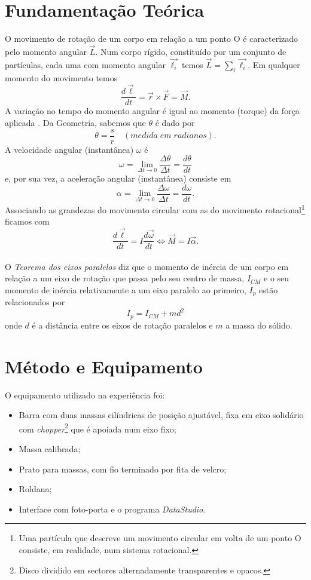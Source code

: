 \documentclass[11pt]{report}
\begin{document}
\chapter{Fundamentação Teórica}
O movimento de rotação de um corpo em relação a um ponto O é caracterizado pelo momento angular $\overrightarrow{L}$. Num corpo rígido, constituído por um conjunto de partículas, cada uma com momento angular $\overrightarrow{\ell_i}$ temos $\overrightarrow{L}=\sum_i \overrightarrow{\ell_i}$.
Em qualquer momento do movimento temos $$\frac{d\overrightarrow{\ell}}{dt}= \overrightarrow{r} \times \overrightarrow{F} = \overrightarrow{M}. $$
A variação no tempo do momento angular é igual ao momento (torque) da força aplicada \cite{Cruz}.
Da Geometria, sabemos que $\theta$ é dado por $$\theta = \frac{s}{r} \quad(medida\; em\; radianos). $$
A velocidade angular (instantânea) $\omega$ é $$\omega = \lim_{\Delta t \to 0} \frac{\Delta \theta}{\Delta t}= \frac{d \theta}{dt} $$
e, por sua vez, a aceleração angular (instantânea) consiste em 
$$\alpha = \lim_{\Delta t \to 0} \frac{\Delta \omega}{\Delta t}= \frac{d \omega}{dt}. $$
Associando as grandezas do movimento circular com as do movimento rotacional\footnote{Uma partícula que descreve um movimento circular em volta de um ponto O consiste, em realidade, num sistema rotacional.} ficamos com $$\frac{d\overrightarrow{\ell}}{dt}=I\frac{d\overrightarrow{\omega}}{dt} \iff \overrightarrow{M}=I\overrightarrow{\alpha}.$$\\
O \textit{Teorema dos eixos paralelos} diz que o momento de inércia de um corpo em relação a um eixo de rotação  que passa pelo seu centro de massa, $I_{CM}$ e o seu momento de inércia relativamente a um eixo paralelo ao primeiro, $I_p$ estão relacionados por $$I_p=I_{CM}+md^2$$ onde $d$ é a distância entre os eixos de rotação paralelos e $m$ a massa do sólido\cite{Cruz}.
\chapter{Método e Equipamento}
O equipamento utilizado na experiência foi:
\begin{itemize}
\item Barra com duas massas cilíndricas de posição ajustável, fixa em eixo solidário com \textit{chopper}\footnote{Disco dividido em sectores alternadamente transparentes e opacos.} que é apoiada num eixo fixo;
\item Massa calibrada;
\item Prato para massas, com fio terminado por fita de velcro; 
\item Roldana;
\item Interface com foto-porta e o programa \textit{DataStudio}.
\end{itemize}
\end{document}

